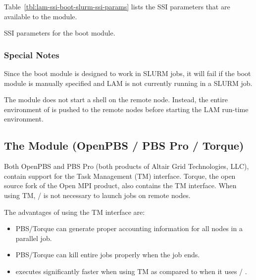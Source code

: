 Table~\ref{tbl:lam-ssi-boot-slurm-ssi-params} lists the SSI parameters
that are available to the  module.

\begin{table}[htbp]
  \begin{ssiparamtb}
%
  \end{ssiparamtb}
  \caption{SSI parameters for the  boot module.}
  \label{tbl:lam-ssi-boot-slurm-ssi-params}
\end{table}


\subsubsection{Special Notes}

Since the  boot module is designed to work in SLURM jobs,
it will fail if the  boot module is manually specified and
LAM is not currently running in a SLURM job.

The  module does not start a shell on the remote node.
Instead, the entire environment of  is pushed to the
remote nodes before starting the LAM run-time environment.
  


\subsection{The  Module (OpenPBS / PBS Pro / Torque)}

Both OpenPBS and PBS Pro (both products of Altair Grid Technologies,
LLC), contain support for the Task Management (TM) interface.  Torque,
the open source fork of the Open MPI product, also contains the TM
interface.  When using TM, / is not necessary to
launch jobs on remote nodes.

The advantages of using the TM interface are:

\begin{itemize}
\item PBS/Torque can generate proper accounting information for all
  nodes in a parallel job.
  
\item PBS/Torque can kill entire jobs properly when the job ends.
  
\item {} executes significantly faster when using TM as
  compared to when it uses  / .
\end{itemize}

